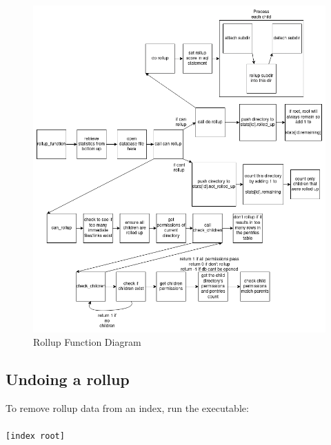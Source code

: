 \begin{figure} [!htb]
  \centering
  \includegraphics[width=\textwidth]{images/rollup_function.png}
  \caption{Rollup Function Diagram}
  \label{fig:rollupfunction}
\end{figure}

\subsection{Undoing a rollup}
To remove rollup data from an index, run the \unrollup executable:
\\\\
\indent \unrollup \texttt{[index root]}
